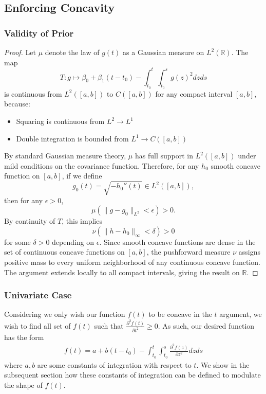 \subsection{Enforcing Concavity}

\label{appendix:convexity}
\subsubsection{Validity of Prior}
\label{appendix:convexity_proof}
\begin{proof}
    
Let $\mu$ denote the law of $g(t)$ as a Gaussian measure on $L^2(\mathbb{R})$.  
The map
\[
T: g \mapsto \beta_0 + \beta_1(t-t_0) - \int_{t_0}^t \int_{t_0}^s g(z)^2 dz ds
\]
is continuous from $L^2([a,b])$ to $C([a,b])$ for any compact interval $[a,b]$, because:
\begin{itemize}
    \item Squaring is continuous from $L^2 \to L^1$
    \item Double integration is bounded from $L^1 \to C([a,b])$
\end{itemize}

By standard Gaussian measure theory, $\mu$ has full support in $L^2([a,b])$ under mild conditions on the covariance function.  
Therefore, for any $h_0$ smooth concave function on $[a,b]$, if we define
\[
g_0(t) = \sqrt{-h_0''(t)} \in L^2([a,b]),
\]
then for any $\epsilon>0$,
\[
\mu(\|g-g_0\|_{L^2}<\epsilon) > 0.
\]
By continuity of $T$, this implies
\[
\nu(\|h - h_0\|_\infty < \delta) > 0
\]
for some $\delta>0$ depending on $\epsilon$.  
Since smooth concave functions are dense in the set of continuous concave functions on $[a,b]$, the pushforward measure $\nu$ assigns positive mass to every uniform neighborhood of any continuous concave function.
The argument extends locally to all compact intervals, giving the result on $\mathbb{R}$.
\end{proof}

\subsubsection{Univariate Case}
\label{appendix:univariate_concavity}
Considering we only wish our function $f(t)$ to be concave in the $t$ argument, we wish to find all set of $f(t)$ such that $\frac{\partial ^2 f(t)}{\partial t^2} \geq 0$. As such, our desired function has the form
\begin{align}
\label{eq:concave_uni_rep}
    f(t) = a + b(t-t_0) - \int_{t_0}^t \int_{t_0}^s \frac{\partial ^2 f(z)}{\partial z^2}dzds 
\end{align}
where $a, b$ are some constants of integration with respect to $t$. We show in the subsequent section how these constants of integration can be defined to modulate the shape of $f(t)$. 


